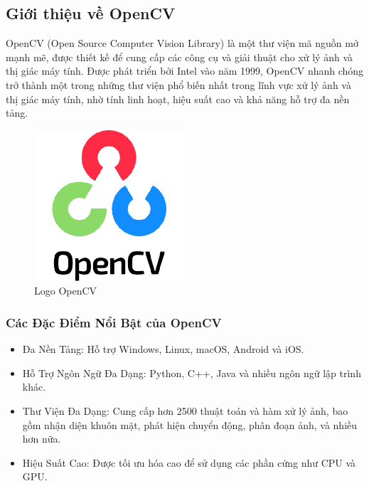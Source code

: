 \begin{flushleft}
    \subsection{Giới thiệu về OpenCV}
    OpenCV (Open Source Computer Vision Library) là một thư viện mã nguồn mở mạnh mẽ, được thiết kế để cung cấp các công cụ và giải thuật cho xử lý ảnh và thị giác máy tính. Được phát triển bởi Intel vào năm 1999, OpenCV nhanh chóng trở thành một trong những thư viện phổ biến nhất trong lĩnh vực xử lý ảnh và thị giác máy tính, nhờ tính linh hoạt, hiệu suất cao và khả năng hỗ trợ đa nền tảng.\\
    \begin{figure}[h]
        \centering
        \includegraphics[width=0.5\textwidth]{images/logoOpenCV.png}
        \caption{Logo OpenCV}
        \label{fig:logo_cv2}
    \end{figure}
    \subsubsection{Các Đặc Điểm Nổi Bật của OpenCV}
    \begin{itemize}
        \item Đa Nền Tảng: Hỗ trợ Windows, Linux, macOS, Android và iOS.
        \item Hỗ Trợ Ngôn Ngữ Đa Dạng: Python, C++, Java và nhiều ngôn ngữ lập trình khác.
        \item Thư Viện Đa Dạng: Cung cấp hơn 2500 thuật toán và hàm xử lý ảnh, bao gồm nhận diện khuôn mặt, phát hiện chuyển động, phân đoạn ảnh, và nhiều hơn nữa.
        \item Hiệu Suất Cao: Được tối ưu hóa cao để sử dụng các phần cứng như CPU và GPU.
    \end{itemize}

\end{flushleft}
